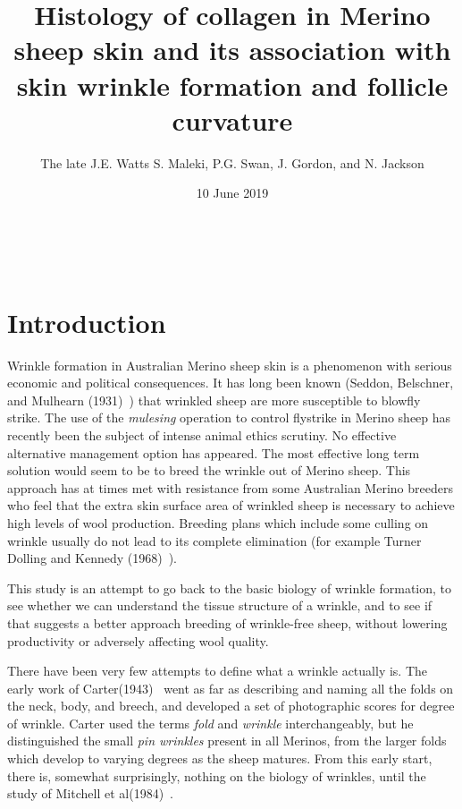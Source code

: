 \documentclass[titlepage]{article}  %
\title{Histology of collagen in Merino sheep skin and its association with skin wrinkle formation and follicle curvature }
\author{The late J.E. Watts S. Maleki, P.G. Swan, J. Gordon, and N. Jackson}
\date{10 June 2019}
\begin{document}
 


 
\maketitle      

$\newcommand{\E}{\mathrm{E}}$
$\newcommand{\Var}{\mathrm{Var}}$
$\newcommand{\Cov}{\mathrm{Cov}}$ 
$\newcommand{\SD}{\mathrm{SD}}$ 

\section{Introduction} 

Wrinkle formation in Australian Merino sheep skin is a phenomenon with serious economic and political consequences.  It has long been known (Seddon, Belschner, and Mulhearn (1931)~\cite{sedd:31}) that wrinkled sheep are more susceptible to blowfly strike. The use of the {\em mulesing} operation to control flystrike in Merino sheep has recently been the subject of intense animal ethics scrutiny. No effective alternative management option has appeared.
The most effective long term solution would seem to be to breed the wrinkle out of Merino sheep. This approach has at times met with resistance from some Australian Merino breeders who feel that the extra skin surface area of wrinkled sheep is necessary to achieve high levels of wool production. Breeding plans which include some culling on wrinkle usually do not lead to its complete elimination (for example Turner Dolling and Kennedy (1968)~\cite{turn:68}).

This study  is an attempt to go back to the basic biology of wrinkle formation, to see whether we can understand the tissue structure of a wrinkle, and to see if that suggests  a better approach breeding of wrinkle-free sheep,  without lowering productivity or adversely affecting wool quality. 

There have been very few attempts to define what a wrinkle actually is. The early work of Carter(1943)~\cite{cart:43} went as far as describing and naming all the folds on the neck, body, and breech, and developed a set of photographic scores for degree of wrinkle. Carter used the terms {\em fold} and {\em wrinkle} interchangeably, but he distinguished the small {\em pin wrinkles} present in all Merinos, from the larger folds which develop to varying degrees as the sheep matures. From this early start, there is, somewhat surprisingly, nothing on the biology of wrinkles, until the study of Mitchell et al(1984)~\cite{mitc:84}. 
\end{document}

